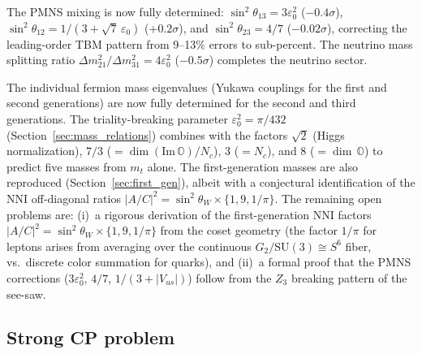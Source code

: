 \documentclass[12pt,a4paper]{article}
\theoremstyle{definition}
\theoremstyle{remark}
\newcommand{\Oct}{\mathbb{O}}
\newcommand{\SU}{\mathrm{SU}}
\begin{document}
The PMNS mixing is now fully determined: $\sin^2\theta_{13} = 3\varepsilon_0^2$ 
($-0.4\sigma$), $\sin^2\theta_{12} = 1/(3 + \sqrt{7}\,\varepsilon_0)$ 
($+0.2\sigma$), and $\sin^2\theta_{23} = 4/7$ ($-0.02\sigma$), correcting 
the leading-order TBM pattern from 9--13\% errors to sub-percent. The neutrino 
mass splitting ratio $\Delta m^2_{21}/\Delta m^2_{31} = 4\varepsilon_0^2$ 
($-0.5\sigma$) completes the neutrino sector.

The individual fermion mass eigenvalues (Yukawa couplings for the first and 
second generations) are now fully determined for the second and third 
generations. The triality-breaking parameter $\varepsilon_0^2 = \pi/432$ 
(Section~\ref{sec:mass_relations}) combines with the factors 
$\sqrt{2}$ (Higgs normalization), $7/3$ ($= \dim(\mathrm{Im}\,\Oct)/N_c$), 
$3$ ($= N_c$), and $8$ ($= \dim\,\Oct$) to predict five masses from $m_t$ 
alone. The first-generation masses are also reproduced 
(Section~\ref{sec:first_gen}), albeit with a conjectural identification 
of the NNI off-diagonal ratios $|A/C|^2 = \sin^2\theta_W \times \{1, 9, 1/\pi\}$. 
The remaining open problems are:
(i)~a rigorous derivation of the first-generation NNI factors 
$|A/C|^2 = \sin^2\theta_W \times \{1, 9, 1/\pi\}$ from the coset geometry 
(the factor $1/\pi$ for leptons arises from averaging over the continuous 
$G_2/\SU(3) \cong S^6$ fiber, vs.\ discrete color summation for quarks), and 
(ii)~a formal proof that the PMNS corrections ($3\varepsilon_0^2$, $4/7$, 
$1/(3{+}|V_{us}|)$) follow from the $Z_3$ breaking pattern of the see-saw.

\subsection{Strong CP problem}
\end{document}
